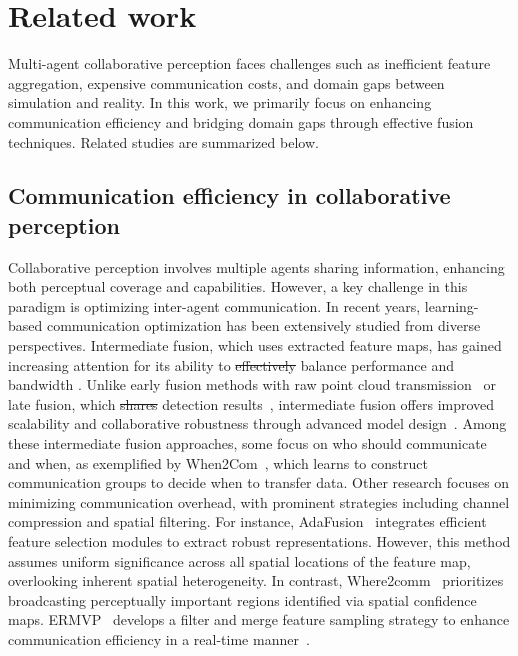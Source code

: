 \documentclass[lettersize,journal]{IEEEtran}
\makeatletter
\providecommand{\DIFadd}[1]{{\protect\color{blue}\uwave{#1}}} %
\providecommand{\DIFdel}[1]{{\protect\color{red}\sout{#1}}} %
\providecommand{\DIFaddbegin}{} %
\providecommand{\DIFaddend}{} %
\providecommand{\DIFdelbegin}{} %
\providecommand{\DIFdelend}{} %
\newcommand{\DIFscaledelfig}{0.5}
\newlength{\DIFdelgraphicswidth} %
\newlength{\DIFdelgraphicsheight} %
\newcommand{\DIFaddincludegraphics}[2][]{{\color{blue}\fbox{\DIFOincludegraphics[#1]{#2}}}} %
\newcommand{\DIFdelincludegraphics}[2][]{%
\sbox{\DIFdelgraphicsbox}{\DIFOincludegraphics[#1]{#2}}%
\settoboxwidth{\DIFdelgraphicswidth}{\DIFdelgraphicsbox} %
\settoboxtotalheight{\DIFdelgraphicsheight}{\DIFdelgraphicsbox} %
\scalebox{\DIFscaledelfig}{%
\parbox[b]{\DIFdelgraphicswidth}{\usebox{\DIFdelgraphicsbox}\\[-\baselineskip] \rule{\DIFdelgraphicswidth}{0em}}\llap{\resizebox{\DIFdelgraphicswidth}{\DIFdelgraphicsheight}{%
\setlength{\unitlength}{\DIFdelgraphicswidth}%
\begin{picture}(1,1)%
\thicklines\linethickness{2pt} %
{\color[rgb]{1,0,0}\put(0,0){\framebox(1,1){}}}%
{\color[rgb]{1,0,0}\put(0,0){\line( 1,1){1}}}%
{\color[rgb]{1,0,0}\put(0,1){\line(1,-1){1}}}%
\end{picture}%
}\hspace*{3pt}}} %
} %
\DeclareRobustCommand{\DIFaddbegin}{\DIFOaddbegin \let\includegraphics\DIFaddincludegraphics} %
\DeclareRobustCommand{\DIFaddend}{\DIFOaddend \let\includegraphics\DIFOincludegraphics} %
\DeclareRobustCommand{\DIFdelbegin}{\DIFOdelbegin \let\includegraphics\DIFdelincludegraphics} %
\DeclareRobustCommand{\DIFdelend}{\DIFOaddend \let\includegraphics\DIFOincludegraphics} %
\let\sout@orig\sout %
\renewcommand{\sout}[1]{\ifmmode\text{\sout@orig{\ensuremath{#1}}}\else\sout@orig{#1}\fi} %
\makeatother
\begin{document}
\section{Related work}\label{sec:related_work} 
Multi-agent collaborative perception faces challenges such as inefficient feature aggregation, expensive communication costs, and domain gaps between simulation and reality. In this work, we primarily focus on enhancing communication efficiency and bridging domain gaps through effective fusion techniques. Related studies are summarized below.

\subsection{Communication efficiency in collaborative perception}
Collaborative perception involves multiple agents sharing information, enhancing both perceptual coverage and capabilities. However, a key challenge in this paradigm is optimizing inter-agent communication. 
In recent years, learning-based communication optimization has been extensively studied from diverse perspectives. 
Intermediate fusion, which uses extracted feature maps, has gained increasing attention for its ability to \DIFdelbegin \DIFdel{effectively }\DIFdelend balance performance and bandwidth \DIFaddbegin \DIFadd{effectively}\DIFaddend . Unlike early fusion methods with raw point cloud transmission~\cite{10807402} or late fusion, which \DIFdelbegin \DIFdel{shares }\DIFdelend \DIFaddbegin \DIFadd{share }\DIFaddend detection results~\cite{104680}, intermediate fusion offers improved scalability and collaborative robustness through advanced model design~\cite{Chen2024}.
Among these intermediate fusion approaches, some focus on who should communicate and when, as exemplified by When2Com~\cite{liuWhen2comMultiAgentPerception2020}, which learns to construct communication groups to decide when to transfer data. Other research focuses on minimizing communication overhead, with prominent strategies including channel compression and spatial filtering. For instance, AdaFusion~\cite{Qiao_2023_WACV} integrates efficient feature selection modules to extract robust representations. However, this method assumes uniform significance across all spatial locations of the feature map, overlooking inherent spatial heterogeneity. In contrast, Where2comm~\cite{Where2comm} prioritizes broadcasting perceptually important regions identified via spatial confidence maps. ERMVP~\cite{10657548} develops a filter and merge feature sampling strategy to enhance communication efficiency in a real-time manner~\cite{Chen2025}. 
\end{document}
